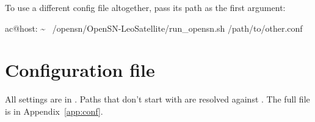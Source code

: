 \documentclass[11pt,a4paper]{article}
\begin{document}
To use a different config file altogether, pass its path as the first argument:

\begin{terminal}{ac@host: \textasciitilde}
~/opensn/OpenSN-LeoSatellite/run_opensn.sh /path/to/other.conf
\end{terminal}

\section{Configuration file}

All settings are in . Paths that don't start
with \cmd{/} are resolved against . The full file is in
Appendix~\ref{app:conf}.
\end{document}

